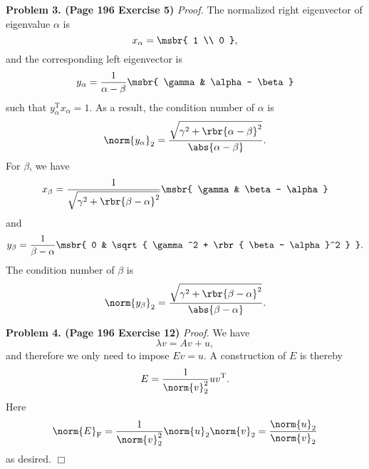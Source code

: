 \documentclass[english, nochinese]{pnote}
\begin{document}
\textbf{Problem 3. (Page 196 Exercise 5)} \textit{Proof.} The normalized right eigenvector of eigenvalue $\alpha$ is
\begin{equation}
x_{\alpha} = \msbr{ 1 \\ 0 },
\end{equation}
and the corresponding left eigenvector is
\begin{equation}
y_{\alpha} = \frac{1}{ \alpha - \beta } \msbr{ \gamma & \alpha - \beta }
\end{equation}
such that $ y_{\alpha}^{\text{T}} x_{\alpha} = 1 $. As a result, the condition number of $\alpha$ is
\begin{equation}
\norm{y_{\alpha}}_2 = \frac{\sqrt{ \gamma^2 + \rbr{ \alpha - \beta }^2 }}{\abs{ \alpha - \beta }}.
\end{equation}
For $\beta$, we have
\begin{equation}
x_{\beta} = \frac{1}{\sqrt{ \gamma^2 + \rbr{ \beta - \alpha }^2}} \msbr{ \gamma & \beta - \alpha }
\end{equation}
and
\begin{equation}
y_{\beta} = \frac{1}{ \beta - \alpha } \msbr{ 0 & \sqrt{ \gamma^2 + \rbr{ \beta - \alpha }^2 } }.
\end{equation}
The condition number of $\beta$ is
\begin{equation}
\norm{y_{\beta}}_2 = \frac{\sqrt{ \gamma^2 + \rbr{ \beta - \alpha }^2 }}{\abs{ \beta - \alpha }}.
\end{equation}

\textbf{Problem 4. (Page 196 Exercise 12)} \textit{Proof.} We have
\begin{equation}
\lambda v = A v + u,
\end{equation}
and therefore we only need to impose $ E v = u $. A construction of $E$ is thereby
\begin{equation}
E = \frac{1}{\norm{v}_2^2} u v^{\text{T}}.
\end{equation}
Here
\begin{equation}
\norm{E}_{\text{F}} = \frac{1}{\norm{v}_2^2} \norm{u}_2 \norm{v}_2 = \frac{\norm{u}_2}{\norm{v}_2}
\end{equation}
as desired.
\hfill$\Box$
\end{document}

